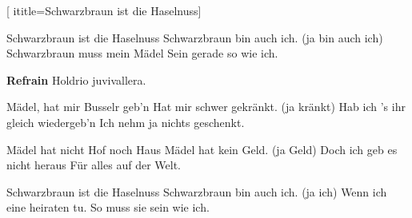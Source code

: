  [
ititle={Schwarzbraun ist die Haselnuss}]

\beginverse
Schwarzbraun ist die Haselnuss
Schwarzbraun bin auch ich. (ja bin auch ich)
Schwarzbraun muss mein Mädel
Sein gerade so wie ich.
\endverse

\beginchorus
\textbf{Refrain}
Holdrio juvivallera.
\endchorus

\beginverse
Mädel, hat mir Busselr geb'n
Hat mir schwer gekränkt. (ja kränkt)
Hab ich 's ihr gleich wiedergeb'n
Ich nehm ja nichts geschenkt.
\endverse

\beginverse
Mädel hat nicht Hof noch Haus
Mädel hat kein Geld. (ja Geld)
Doch ich geb es nicht heraus
Für alles auf der Welt.
\endverse

\beginverse
Schwarzbraun ist die Haselnuss
Schwarzbraun bin auch ich. (ja ich)
Wenn ich eine heiraten tu.
So muss sie sein wie ich.
\endverse
\endsong